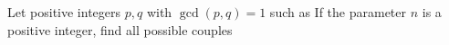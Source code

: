 Let positive integers $p,q$ with $\gcd(p,q)=1$ such as  If the parameter $n$ is a positive integer, find all possible couples 